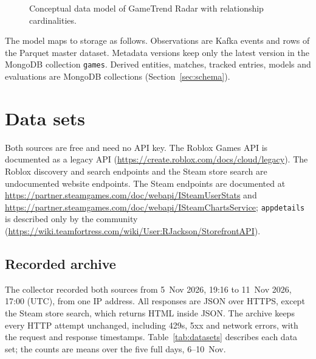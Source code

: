 \documentclass[10pt,a4paper]{article}
\newcommand{\ep}[1]{\texttt{\small #1}}
\begin{document}
\begin{figure}[H]
\centering
\resizebox{0.92\textwidth}{!}{}
\caption{Conceptual data model of GameTrend Radar with relationship cardinalities.}
\label{fig:datamodel}
\end{figure}

The model maps to storage as follows. Observations are Kafka events and rows of the Parquet master dataset. Metadata versions keep only the latest version in the MongoDB collection \ep{games}. Derived entities, matches, tracked entries, models and evaluations are MongoDB collections (Section~\ref{sec:schema}).

\section{Data sets}\label{sec:datasets}
Both sources are free and need no API key. The Roblox Games API is documented as a legacy API (\url{https://create.roblox.com/docs/cloud/legacy}). The Roblox discovery and search endpoints and the Steam store search are undocumented website endpoints. The Steam endpoints are documented at \url{https://partner.steamgames.com/doc/webapi/ISteamUserStats} and \url{https://partner.steamgames.com/doc/webapi/ISteamChartsService}; \ep{appdetails} is described only by the community (\url{https://wiki.teamfortress.com/wiki/User:RJackson/StorefrontAPI}).

\subsection{Recorded archive}
The collector recorded both sources from 5~Nov 2026, 19:16 to 11~Nov 2026, 17:00 (UTC), from one IP address. All responses are JSON over HTTPS, except the Steam store search, which returns HTML inside JSON. The archive keeps every HTTP attempt unchanged, including 429s, 5xx and network errors, with the request and response timestamps. Table~\ref{tab:datasets} describes each data set; the counts are means over the five full days, 6--10~Nov.
\end{document}
